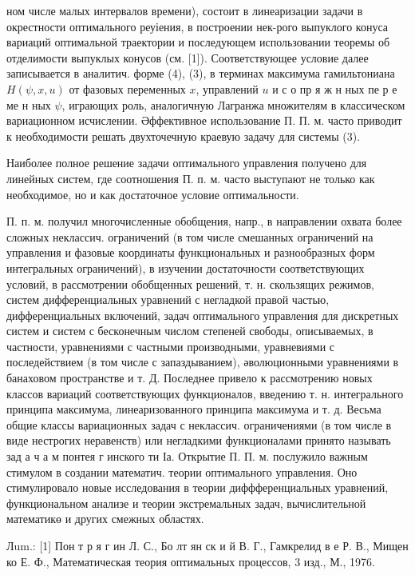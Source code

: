 \documentclass[10pt]{article}
\begin{document}
ном числе малых интервалов времени), состоит в линеаризации задачи в окрестности оптимального реуіения, в построении нек-рого выпуклого конуса вариаций оптимальной траектории и последующем использовании теоремы об отделимости выпуклых конусов (см. [1]). Соответствующее условие далее записывается в аналитич. форме (4), (3), в терминах максимума гамильтониана $H(\psi, x, u)$ от фазовых переменных $x$, управлений $u$ и с о пр я ж н ных пе р е ме н ных $\psi$, играющих роль, аналогичную Лагранжа множителям в классическом вариационном исчислении. Әффективное использование П. П. м. часто приводит к необходимости решать двухточечную краевую задачу для системы (3).



Наиболее полное решение задачи оптимального управления получено для линейных систем, где соотношения П. п. м. часто выступают не только как необходимое, но и как достаточное условие оптимальности.



П. п. м. получил многочисленные обобщения, напр., в направлении охвата более сложных неклассич. ограничений (в том числе смешанных ограничений на управления и фазовые координаты функциональных и разнообразных форм интегральных ограничений), в изучении достаточности соответствующих условий, в рассмотрении обобщенных решений, т. н. скользящих режимов, систем дифференциальных уравнений с негладкой правой частью, дифференциальных включений, задач оптимального управления для дискретных систем и систем с бесконечным числом степеней свободы, описываемых, в частности, уравнениями с частными производными, уравневиями с последействием (в том числе с запаздыванием), әволюционными уравнениями в банаховом пространстве и т. Д. Последнее привело к рассмотрению новых классов вариаций соответствующих функционалов, введению т. н. интегрального принципа максимума, линеаризованного принципа максимума и т. д. Весьма общие классы вариационных задач с неклассич. ограничениями (в том числе в виде нестрогих неравенств) или негладкими функционалами принято называть зад а ч а м понтея г инского ти Іа. Открытие П. П. м. послужило важным стимулом в создании математич. теории оптимального управления. Оно стимулировало новые исследования в теории диффференциальных уравнений, функциональном анализе и теории экстремальных задач, вычислительной математикө и других смежных областях.



Лum.: [1] Пон т р я г ин Л. С., Бо лт ян ск и й В. Г., Гамкрелид в е Р. В., Мищен ко Е. Ф., Математическая теория оптимальных процессов, 3 изд., М., 1976.
\end{document}
